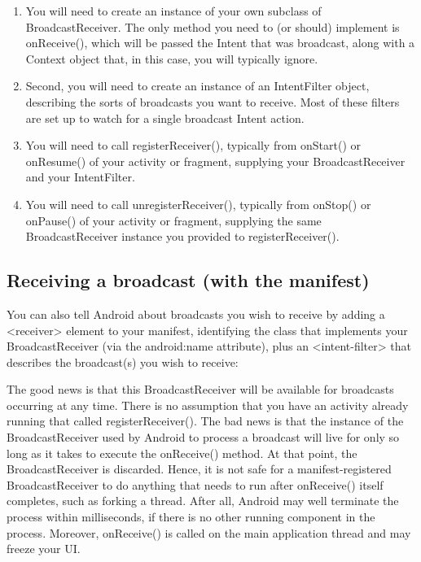 \begin{enumerate}
	\item You will need to create an instance of your own subclass of BroadcastReceiver.
	The only method you need to (or should) implement is onReceive(), which will be passed the Intent that was broadcast, along with a Context object that, in this case, you will typically ignore. 
	\item Second, you will need to create an instance of an IntentFilter object, describing	the sorts of broadcasts you want to receive. 
	Most of these filters are set up to watch for a single broadcast Intent action.
	\item You will need to call registerReceiver(), typically from onStart() or onResume() of your activity or fragment, supplying your BroadcastReceiver and your IntentFilter.
	\item You will need to call unregisterReceiver(), typically from onStop() or onPause() of your activity or fragment, supplying the same BroadcastReceiver instance you provided	to registerReceiver().
\end{enumerate}

\subsection{Receiving a broadcast (with the manifest)}
You can also tell Android about broadcasts you wish to receive by adding a <receiver> element to your manifest, identifying the class that implements your BroadcastReceiver (via the android:name attribute), plus an <intent-filter> that describes the broadcast(s) you wish to receive:



The good news is that this BroadcastReceiver will be available for broadcasts occurring at any time.
There is no assumption that you have an activity already running that called registerReceiver().
The bad news is that the instance of the BroadcastReceiver used by Android to process a broadcast will live for only so long as it takes to execute the onReceive() method.
At that point, the BroadcastReceiver is discarded.
Hence, it is not safe for a manifest-registered BroadcastReceiver to do anything that needs to run after onReceive() itself completes, such as forking a thread.
After all, Android may well terminate the process within milliseconds, if there is no other running component in the process.
Moreover, onReceive() is called on the main application thread and may freeze your UI.